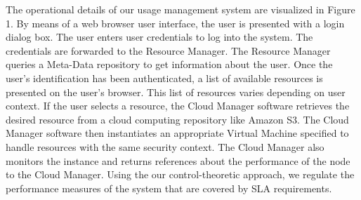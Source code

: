 \documentclass{sig-alternate}
\begin{document}

The operational details of our usage management system are visualized in Figure 1.  By means of a web browser user interface, the user is presented with a login dialog box. The user enters user credentials to log into the system. The credentials are forwarded to the Resource Manager. The Resource Manager queries a Meta-Data repository to get information about the user.  Once the user's identification has been authenticated, a list of available resources is presented on the user's browser.  This list of resources varies depending on user context. If the user selects a resource, the Cloud Manager software retrieves the desired resource from a cloud computing repository like Amazon S3.  The Cloud Manager software then instantiates an appropriate Virtual Machine specified to handle resources with the same security context. The Cloud Manager also monitors the instance and returns references about the performance of the node to the Cloud Manager.  Using the our control-theoretic approach, we regulate the performance measures of the system that are covered by SLA requirements.
\end{document}

